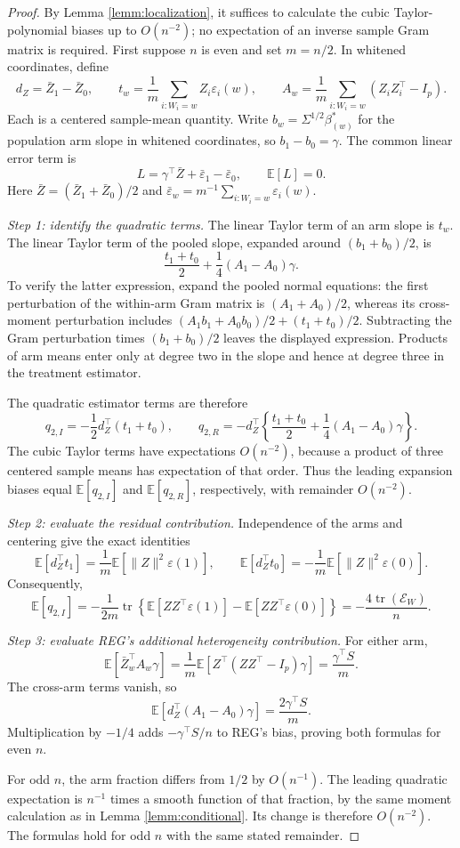 \documentclass{article}
\newcommand{\EEE}{\mathbb{E}}
\DeclareMathOperator{\tr}{tr}
\theoremstyle{plain}
\theoremstyle{definition}
\theoremstyle{remark}
\begin{document}
\begin{proof}
By Lemma \ref{lemm:localization}, it suffices to calculate the cubic Taylor-polynomial biases up to $O(n^{-2})$; no expectation of an inverse sample Gram matrix is required. First suppose
$n$ is even and set $m=n/2$. In whitened coordinates, define
\[
d_Z=\bar Z_1-\bar Z_0,\qquad
t_w=\frac1m\sum_{i:W_i=w}Z_i\varepsilon_i(w),\qquad
A_w=\frac1m\sum_{i:W_i=w}(Z_iZ_i^\top-I_p).
\]
Each is a centered sample-mean quantity. Write
$b_w=\Sigma^{1/2}\beta^*_{(w)}$ for the population arm slope
in whitened coordinates, so $b_1-b_0=\gamma$.
The common linear error term is
\[
L=\gamma^\top\bar Z+\bar\varepsilon_1-\bar\varepsilon_0,
\qquad \EEE[L]=0.
\]
Here $\bar Z=(\bar Z_1+\bar Z_0)/2$ and
$\bar\varepsilon_w=m^{-1}\sum_{i:W_i=w}\varepsilon_i(w)$.

\emph{Step 1: identify the quadratic terms.}
The linear Taylor term of an arm slope is $t_w$. The linear Taylor
term of the pooled slope, expanded around $(b_1+b_0)/2$, is
\[
\frac{t_1+t_0}{2}+\frac14(A_1-A_0)\gamma.
\]
To verify the latter expression, expand the pooled normal equations:
the first perturbation of the within-arm Gram matrix is
$(A_1+A_0)/2$, whereas its cross-moment perturbation includes
$(A_1b_1+A_0b_0)/2+(t_1+t_0)/2$.
Subtracting the Gram perturbation times $(b_1+b_0)/2$ leaves the
displayed expression. Products of arm means enter only at degree two
in the slope and hence at degree three in the treatment estimator.

The quadratic estimator terms are therefore
\[
q_{2,I}=-\frac12d_Z^\top(t_1+t_0),
\qquad
q_{2,R}=-d_Z^\top\left\{
\frac{t_1+t_0}{2}+\frac14(A_1-A_0)\gamma\right\}.
\]
The cubic Taylor terms have expectations $O(n^{-2})$, because a
product of three centered sample means has expectation of that order.
Thus the leading expansion biases equal $\EEE[q_{2,I}]$ and
$\EEE[q_{2,R}]$, respectively, with remainder $O(n^{-2})$.

\emph{Step 2: evaluate the residual contribution.}
Independence of the arms and centering give the exact identities
\[
\EEE[d_Z^\top t_1]
=\frac1m\EEE[\|Z\|^2\varepsilon(1)],
\qquad
\EEE[d_Z^\top t_0]
=-\frac1m\EEE[\|Z\|^2\varepsilon(0)].
\]
Consequently,
\[
\EEE[q_{2,I}]
=-\frac{1}{2m}\tr\left\{
\EEE[ZZ^\top\varepsilon(1)]
-\EEE[ZZ^\top\varepsilon(0)]\right\}
=-\frac{4\tr(\mathcal E_W)}{n}.
\]

\emph{Step 3: evaluate REG's additional heterogeneity contribution.}
For either arm,
\[
\EEE[\bar Z_w^\top A_w\gamma]
=\frac1m\EEE[Z^\top(ZZ^\top-I_p)\gamma]
=\frac{\gamma^\top S}{m}.
\]
The cross-arm terms vanish, so
\[
\EEE[d_Z^\top(A_1-A_0)\gamma]
=\frac{2\gamma^\top S}{m}.
\]
Multiplication by $-1/4$ adds $-\gamma^\top S/n$ to REG's
bias, proving both formulas for even $n$.

For odd $n$, the arm fraction differs from $1/2$ by $O(n^{-1})$.
The leading quadratic expectation is $n^{-1}$ times a smooth
function of that fraction, by the same moment calculation as in
Lemma \ref{lemm:conditional}. Its change is therefore $O(n^{-2})$.
The formulas hold for odd $n$ with the same stated remainder.
\end{proof}
\end{document}
